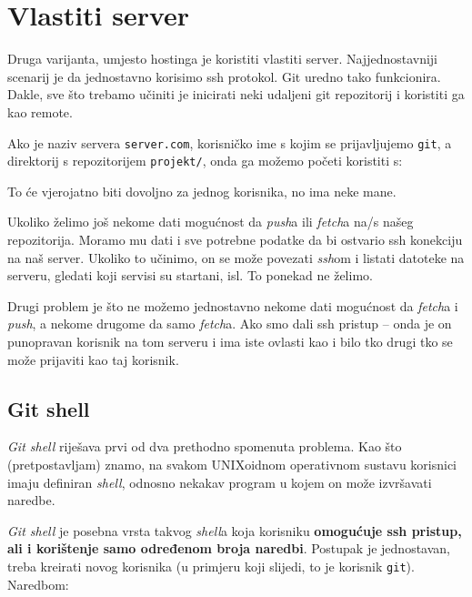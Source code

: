 \section*{Vlastiti server}

Druga varijanta, umjesto hostinga je koristiti vlastiti server.
Najjednostavniji scenarij je da jednostavno korisimo ssh protokol. 
Git uredno tako funkcionira.
Dakle, sve što trebamo učiniti je inicirati neki udaljeni git repozitorij i koristiti ga kao remote.

Ako je naziv servera \verb+server.com+, korisničko ime s kojim se prijavljujemo \verb+git+, a direktorij s repozitorijem \verb+projekt/+, onda ga možemo početi koristiti s:


To će vjerojatno biti dovoljno za jednog korisnika, no ima neke mane.

Ukoliko želimo još nekome dati mogućnost da \emph{push}a ili \emph{fetch}a na/s našeg repozitorija. 
Moramo mu dati i sve potrebne podatke da bi ostvario ssh konekciju na naš server.
Ukoliko to učinimo, on se može povezati \emph{ssh}om i listati datoteke na serveru, gledati koji servisi su startani, isl.
To ponekad ne želimo.

Drugi problem je što ne možemo jednostavno nekome dati mogućnost da \emph{fetch}a i \emph{push}, a nekome drugome da samo \emph{fetch}a.
Ako smo dali ssh pristup -- onda je on punopravan korisnik na tom serveru i ima iste ovlasti kao i bilo tko drugi tko se može prijaviti kao taj korisnik.

\subsection*{Git shell}

\emph{Git shell} riješava prvi od dva prethodno spomenuta problema. 
Kao što (pretpostavljam) znamo, na svakom UNIXoidnom operativnom sustavu korisnici imaju definiran \emph{shell}, odnosno nekakav program u kojem on može izvršavati naredbe.

\emph{Git shell} je posebna vrsta takvog \emph{shell}a koja korisniku \textbf{omogućuje ssh pristup, ali i korištenje samo određenom broja naredbi}.
Postupak je jednostavan, treba kreirati novog korisnika (u primjeru koji slijedi, to je korisnik \verb+git+).
Naredbom:


